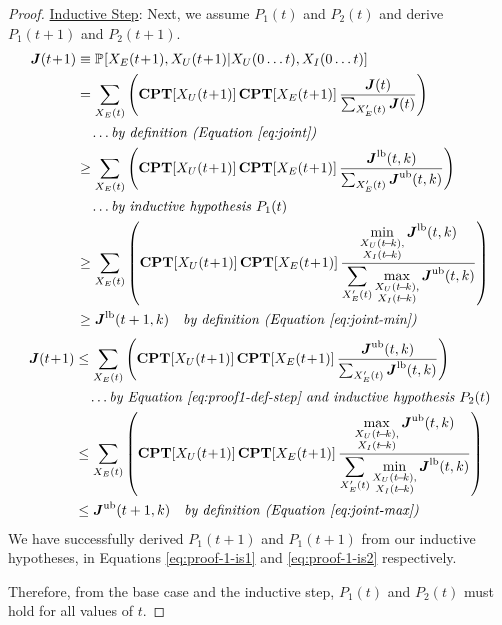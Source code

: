\documentclass[10pt]{article}
\newcommand{\X}{\mathcal{X}}
\newcommand{\PP}[2][]{\mathbb{P\!}_{#1}\left[#2\right]}
\begin{document}
\begin{proof}
\noindent \underline{Inductive Step}: Next, we assume $P_1(t)$ and $P_2(t)$ and derive $P_1(t\!+\!1)$ and $P_2(t\!+\!1)$.
{
\small
\begin{align}
\boldsymbol{J}(t\!+\!1) &\equiv \PP{X_{E}(t\!+\!1),X_{U}(t\!+\!1)|X_{U}(0\ldots t),X_{I}(0\ldots t)}\nonumber\\
&= 
\sum_{X_{E}(t)}
\left(
\textbf{CPT}\!\left[X_{U}(t\!+\!1)\right]
\textbf{CPT}\!\left[X_{E}(t\!+\!1)\right]
\frac{
\boldsymbol{J}(t)
}{
  \sum_{X_{E}'(t)} \boldsymbol{J}(t)
}
\right)\label{eq:proof1-def-step}\\
&\quad\ldots\textit{by definition (Equation \ref{eq:joint})}\nonumber\\
&\geq 
\sum_{X_{E}(t)}
\left(
\textbf{CPT}\!\left[X_{U}(t\!+\!1)\right]
\textbf{CPT}\!\left[X_{E}(t\!+\!1)\right]
\frac{
\boldsymbol{J}^\text{lb}(t,k)
}{
  \sum_{X_{E}'(t)} \boldsymbol{J}^\text{ub}(t,k)
}
\right)\\
&\quad\ldots\textit{by inductive hypothesis }P_1(t)\nonumber\\
&\geq 
\sum_{X_{E}(t)}
\left(
\textbf{CPT}\!\left[X_{U}(t\!+\!1)\right]
\textbf{CPT}\!\left[X_{E}(t\!+\!1)\right]
\frac{
\displaystyle\min_{\substack{X_{U}(t\!-\!k),\\X_{I}(t\!-\!k)}}
\boldsymbol{J}^\text{lb}(t,k)
}{
\displaystyle\sum_{X_{E}'(t)} 
\displaystyle\max_{\substack{X_{U}(t\!-\!k),\\X_{I}(t\!-\!k)}}
\boldsymbol{J}^\text{ub}(t,k)
}
\right)\\
&\geq \boldsymbol{J}^\text{lb}(t+1,k)
\quad\textit{by definition (Equation \ref{eq:joint-min})} \label{eq:proof-1-is1}
\end{align}
\begin{align}
\boldsymbol{J}(t\!+\!1) 
&\leq 
\sum_{X_{E}(t)}
\left(
\textbf{CPT}\!\left[X_{U}(t\!+\!1)\right]
\textbf{CPT}\!\left[X_{E}(t\!+\!1)\right]
\frac{
\boldsymbol{J}^\text{ub}(t,k)
}{
  \sum_{X_{E}'(t)} \boldsymbol{J}^\text{lb}(t,k)
}
\right)\\
&\quad\ldots\textit{by Equation \ref{eq:proof1-def-step} and inductive hypothesis }P_2(t)\nonumber\\
&\leq 
\sum_{X_{E}(t)}
\left(
\textbf{CPT}\!\left[X_{U}(t\!+\!1)\right]
\textbf{CPT}\!\left[X_{E}(t\!+\!1)\right]
\frac{
\displaystyle\max_{\substack{X_{U}(t\!-\!k),\\X_{I}(t\!-\!k)}}
\boldsymbol{J}^\text{ub}(t,k)
}{
\displaystyle\sum_{X_{E}'(t)} 
\displaystyle\min_{\substack{X_{U}(t\!-\!k),\\X_{I}(t\!-\!k)}}
\boldsymbol{J}^\text{lb}(t,k)
}
\right)\\
&\leq \boldsymbol{J}^\text{ub}(t+1,k)
\quad\textit{by definition (Equation \ref{eq:joint-max})} \label{eq:proof-1-is2}
\end{align}
}We have successfully derived $P_1(t\!+\!1)$ and $P_1(t\!+\!1)$ from our inductive hypotheses, in Equations \ref{eq:proof-1-is1} and \ref{eq:proof-1-is2} respectively.  

Therefore, from the base case and the inductive step, $P_1(t)$ and $P_2(t)$ must hold for all values of $t$.
\end{proof}
\end{document}
